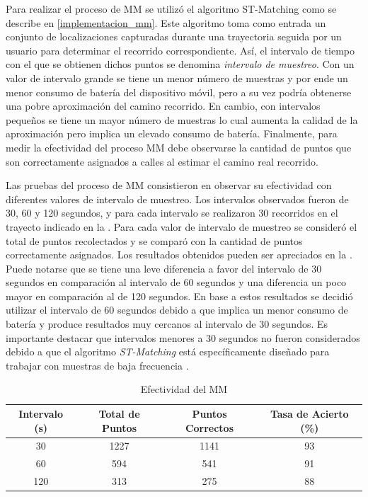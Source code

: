 Para realizar el proceso de MM se utilizó el algoritmo ST-Matching como se describe en \cref{implementacion_mm}. Este algoritmo toma como entrada un conjunto de localizaciones capturadas durante una trayectoria seguida por un usuario para determinar el recorrido correspondiente. Así, el intervalo de tiempo con el que se obtienen dichos puntos se denomina \emph{intervalo de muestreo}. Con un valor de intervalo grande se tiene un menor número de muestras y por ende un menor consumo de batería del dispositivo móvil, pero a su vez podría obtenerse una pobre aproximación del camino recorrido. En cambio, con intervalos pequeños se tiene un mayor número de muestras lo cual aumenta la calidad de la aproximación pero implica un elevado consumo de batería. Finalmente, para medir la efectividad del proceso MM debe observarse la cantidad de puntos que son correctamente asignados a calles al estimar el camino real recorrido.

Las pruebas del proceso de MM consistieron en observar su efectividad con diferentes valores de intervalo de muestreo. Los intervalos observados fueron de 30, 60 y 120 segundos, y para cada intervalo se realizaron 30 recorridos en el trayecto indicado en la . Para cada valor de intervalo de muestreo se consideró el total de puntos recolectados y se comparó con la cantidad de puntos correctamente asignados. Los resultados obtenidos pueden ser apreciados en la . Puede notarse que se tiene una leve diferencia a favor del intervalo de 30 segundos en comparación al intervalo de 60 segundos y una diferencia un poco mayor en comparación al de 120 segundos. En base a estos resultados se decidió utilizar el intervalo de 60 segundos debido a que implica un menor consumo de batería y produce resultados muy cercanos al intervalo de 30 segundos. Es importante destacar que intervalos menores a 30 segundos no fueron considerados debido a que el algoritmo \emph{ST-Matching} está específicamente diseñado para trabajar con muestras de baja frecuencia \cite{lou2009map}.

\begin{table}[h]
	\centering
	\begin{tabular}{cccc}
        \toprule
    	Intervalo (s) & Total de Puntos & Puntos Correctos & Tasa de Acierto (\%)\\
    	\midrule
    	30 & 1227  & 1141 & 93 \\
    	60 & 594 & 541 & 91 \\
		120 & 313 & 275 & 88 \\  
    	\bottomrule
	\end{tabular}
	\caption{Efectividad del MM} 
	\label{table:map_matching}
\end{table}

